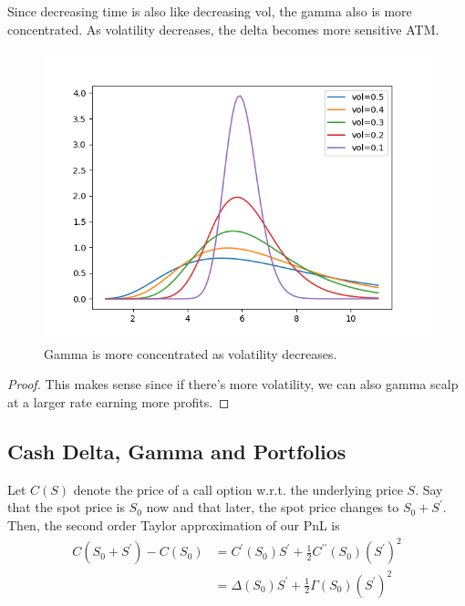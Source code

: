 \documentclass{article}
\begin{document}
    \begin{theorem}
      Since decreasing time is also like decreasing vol, the gamma also is more concentrated. As volatility decreases, the delta becomes more sensitive ATM. 
      \begin{figure}[H]
        \centering 
        \includegraphics[scale=0.45]{img/gamma_wrt_vol.png}
        \caption{Gamma is more concentrated as volatility decreases.} 
        \label{fig:gamma_wrt_vol}
      \end{figure}
    \end{theorem}
    \begin{proof}
      This makes sense since if there's more volatility, we can also gamma scalp at a larger rate earning more profits. 
    \end{proof}

  \subsection{Cash Delta, Gamma and Portfolios}

    Let $C(S)$ denote the price of a call option w.r.t. the underlying price $S$. Say that the spot price is $S_0$ now and that later, the spot price changes to $S_0 + S^\prime$. Then, the second order Taylor approximation of our PnL is 
    \begin{align}
      C(S_0 + S^\prime) - C(S_0) & = C^\prime (S_0) S^\prime + \frac{1}{2} C^{\prime\prime} (S_0) (S^\prime)^2 \\
                                 & = \Delta(S_0) S^\prime + \frac{1}{2} \Gamma(S_0) (S^\prime)^2
    \end{align}
\end{document}
